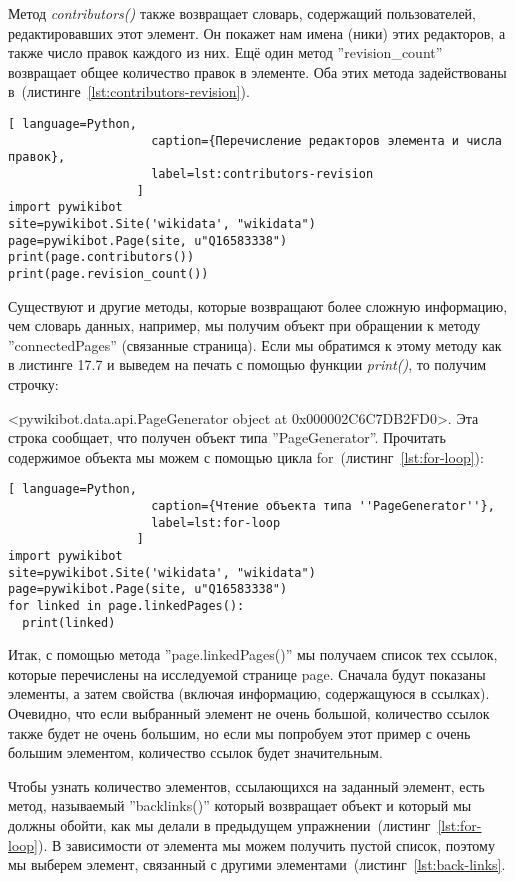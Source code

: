 Метод \textit{contributors()} также возвращает словарь, содержащий пользователей, редактировавших этот элемент. Он покажет нам имена (ники) этих редакторов, а также число правок каждого из них. Ещё один метод ''revision\_count'' возвращает общее количество правок в элементе. Оба этих метода задействованы в~(листинге~\ref{lst:contributors-revision}).

\begin{lstlisting}[ language=Python,
                    caption={Перечисление редакторов элемента и числа правок},
                    label=lst:contributors-revision
                  ]
import pywikibot
site=pywikibot.Site('wikidata', "wikidata")
page=pywikibot.Page(site, u"Q16583338")
print(page.contributors())
print(page.revision_count())
\end{lstlisting}

Существуют и другие методы, которые возвращают более сложную информацию, чем словарь данных, например, мы получим объект при обращении к методу ''connectedPages'' (связанные страница). Если мы обратимся к этому методу как в листинге 17.7 и выведем на печать с помощью функции \textit{print()}, то получим строчку: 

<pywikibot.data.api.PageGenerator object at 0x000002C6C7DB2FD0>.
Эта строка сообщает, что получен объект типа ''PageGenerator''. Прочитать содержимое объекта мы можем с помощью цикла for~(листинг~\ref{lst:for-loop}):

\begin{lstlisting}[ language=Python,
                    caption={Чтение объекта типа ''PageGenerator''},
                    label=lst:for-loop
                  ]
import pywikibot
site=pywikibot.Site('wikidata', "wikidata")
page=pywikibot.Page(site, u"Q16583338")
for linked in page.linkedPages():
  print(linked)
\end{lstlisting}

Итак, с помощью метода ''page.linkedPages()'' мы получаем список тех ссылок, которые перечислены на исследуемой странице page. Сначала будут показаны элементы, а затем свойства (включая информацию, содержащуюся в ссылках). Очевидно, что если выбранный элемент не очень большой, количество ссылок также будет не очень большим, но если мы попробуем этот пример с очень большим элементом, количество ссылок будет значительным.

Чтобы узнать количество элементов, ссылающихся на заданный элемент, есть метод, называемый ''backlinks()'' который возвращает объект и который мы должны обойти, как мы делали в предыдущем упражнении~(листинг~\ref{lst:for-loop}). В зависимости от элемента мы можем получить пустой список, поэтому мы выберем элемент, связанный с другими элементами~(листинг~\ref{lst:back-links}.


